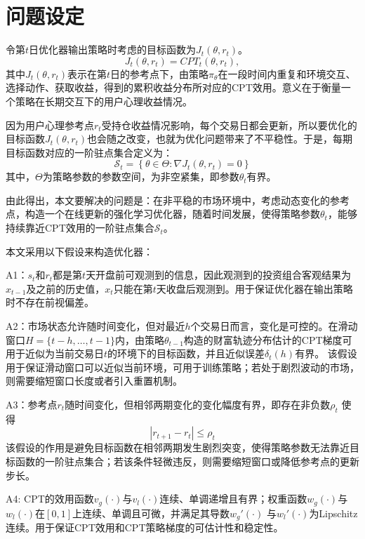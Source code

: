 \documentclass{sufethesismas}
\begin{document}
\section{问题设定}
令第$t$日优化器输出策略时考虑的目标函数为$J_t(\theta,r_t)$。
\begin{equation}
J_t(\theta,r_t)=CPT_t(\theta,r_t),
\end{equation}
其中$J_t(\theta,r_t)$表示在第$t$日的参考点下，由策略$\pi_{\theta}$在一段时间内重复和环境交互、选择动作、获取收益，得到的累积收益分布所对应的CPT效用。意义在于衡量一个策略在长期交互下的用户心理收益情况。

因为用户心理参考点$r_t$受持仓收益情况影响，每个交易日都会更新，所以要优化的目标函数$J_t(\theta,r_t)$也会随之改变，也就为优化问题带来了不平稳性。于是，每期目标函数对应的一阶驻点集合定义为：
\begin{equation}
\mathcal{S}_t=\left\{\theta \in \Theta:\nabla J_t(\theta,r_t)=0\right\}
\end{equation}
其中，$\Theta$为策略参数的参数空间，为非空紧集，即参数${\theta_t}$有界。

由此得出，本文要解决的问题是：在非平稳的市场环境中，考虑动态变化的参考点，构造一个在线更新的强化学习优化器，随着时间发展，使得策略参数$\theta_t$，能够持续靠近CPT效用的一阶驻点集合$\mathcal{S}_t$。

本文采用以下假设来构造优化器：

A1：$s_t$和$r_t$都是第$t$天开盘前可观测到的信息，因此观测到的投资组合客观结果为$x_{t-1}$及之前的历史值，$x_t$只能在第$t$天收盘后观测到。用于保证优化器在输出策略时不存在前视偏差。

A2：市场状态允许随时间变化，但对最近$h$个交易日而言，变化是可控的。在滑动窗口$H=\{t-h,\dots,t-1\}$内，由策略$\theta_{t-1}$构造的财富轨迹分布估计的CPT梯度可用于近似为当前交易日$t$的环境下的目标函数，并且近似误差$\delta_t(h)$有界。
该假设用于保证滑动窗口可以近似当前环境，可用于训练策略；若处于剧烈波动的市场，则需要缩短窗口长度或者引入重置机制。

A3：参考点$r_t$随时间变化，但相邻两期变化的变化幅度有界，即存在非负数$\rho_t$ 使得
\begin{equation}
|r_{t+1}-r_t|\le \rho_t
\end{equation}
该假设的作用是避免目标函数在相邻两期发生剧烈突变，使得策略参数无法靠近目标函数的一阶驻点集合；若该条件轻微违反，则需要缩短窗口或降低参考点的更新步长。

A4: CPT的效用函数$v_g(\cdot)$与$v_l(\cdot)$连续、单调递增且有界；权重函数$w_g(\cdot)$与$w_l(\cdot)$在$[0,1]$上连续、单调且可微，并满足其导数$w_g'(\cdot)$ 与$w_l'(\cdot)$为Lipschitz连续。用于保证CPT效用和CPT策略梯度的可估计性和稳定性。
\end{document}
